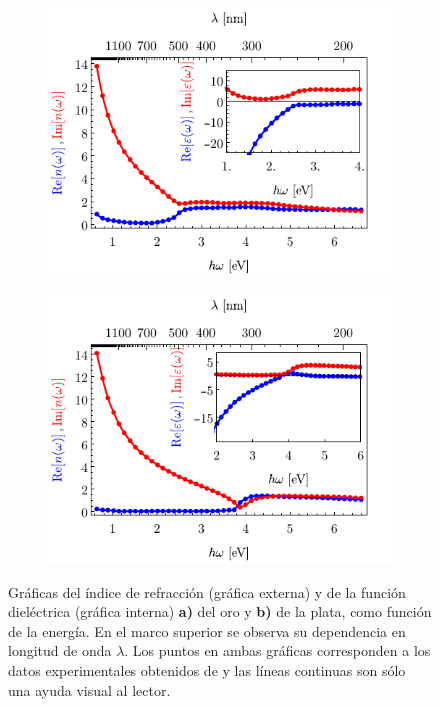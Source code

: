 \documentclass[letterpaper,11pt] {article}
\begin{document}
\begin{figure}[b!]\centering
	\begin{subfigure}{.01\linewidth}\caption{}\label{sfig:nAuJC}\vspace{4cm}\end{subfigure}\hspace*{-1em}
	\begin{subfigure}{.46\linewidth}\centering \includegraphics[scale=1.05]{0-varepsn_JC_Au.pdf}\end{subfigure}
	\begin{subfigure}{.01\linewidth}\caption{}\label{sfig:nAgJC}\vspace{4cm}\end{subfigure}\hspace*{-1em}
	\begin{subfigure}{.45\linewidth}\centering \includegraphics[scale=1.05]{0-varepsn_JC_Ag.pdf}\end{subfigure}
	\caption{ Gráficas del índice de refracción (gráfica externa) y de la función dieléctrica (gráfica interna)  \textbf{a)} del oro y \textbf{b)} de la plata,  como función de la energía.  En el marco superior se observa su dependencia en longitud de onda $\lambda$.  Los puntos en ambas gráficas corresponden a los datos experimentales obtenidos de \cite{johnson1972contants} y las líneas continuas son sólo una ayuda visual al lector. }\label{fig:nJC}
	\end{figure}	
\end{document}
